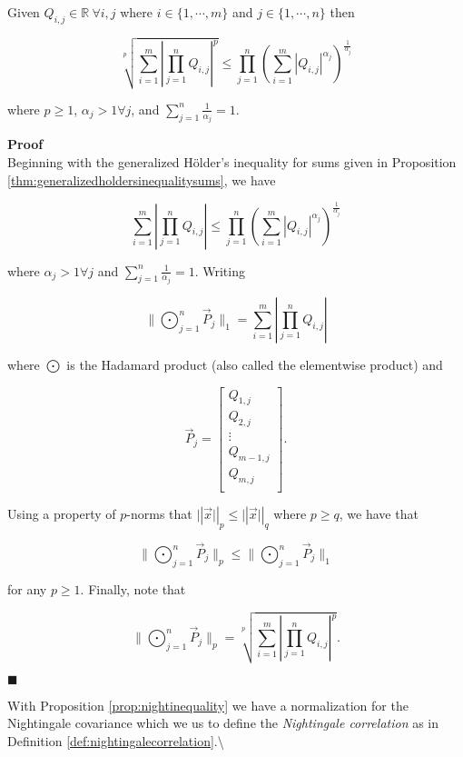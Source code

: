 \documentclass[
  letterpaper,
  DIV=11,
  numbers=noendperiod]{scrreprt}
\begin{document}
\begin{Proposition}[myproposition=, label=prop:nightinequality]
Given $Q_{i,j} \in \mathbb{R}\ \forall i,j$ where $i \in \{ 1, \cdots, m \}$ and $j \in \{ 1, \cdots, n \}$ then

$$\sqrt[p]{\sum_{i=1}^{m} \left|\prod_{j=1}^{n} Q_{i,j}\right|^p} \leq \prod_{j=1}^{n} \left( \sum_{i=1}^{m} |Q_{i,j}|^{\alpha_j} \right)^{\frac{1}{\alpha_j}}$$

where $p \geq 1$, $\alpha_j > 1 \forall j$, and $\sum_{j=1}^n \frac{1}{\alpha_j} = 1$.

\tcbline
\textbf{Proof}\\
\scriptsize
Beginning with the generalized H\"older's inequality for sums given in Proposition \ref{thm:generalizedholdersinequalitysums}, we have

$$\sum_{i=1}^{m} \left|\prod_{j=1}^{n} Q_{i,j}\right| \leq \prod_{j=1}^{n} \left( \sum_{i=1}^{m} |Q_{i,j}|^{\alpha_j} \right)^{\frac{1}{\alpha_j}}$$

where $\alpha_j > 1 \forall j$ and $\sum_{j=1}^n \frac{1}{\alpha_j} = 1$. Writing 

$$\biggl \| \bigodot_{j=1}^{n} \vec{P}_j \biggr  \|_1 = \sum_{i=1}^{m} \left|\prod_{j=1}^{n} Q_{i,j}\right|$$

where $\bigodot$ is the Hadamard product (also called the elementwise product) and 

$$\vec{P}_j = \begin{bmatrix}
Q_{1,j} \\
Q_{2,j} \\
\vdots \\
Q_{m-1,j} \\
Q_{m,j} \\
\end{bmatrix}.$$

Using a property of $p$-norms that $\vert| \vec{x} \vert|_p \leq \vert| \vec{x} \vert|_q$ where $p \geq q$, we have that 

$$\biggl \| \bigodot_{j=1}^{n} \vec{P}_j \biggr  \|_p \leq \biggl \| \bigodot_{j=1}^{n} \vec{P}_j \biggr  \|_1$$

for any $p \geq 1$. Finally, note that

$$\biggl \| \bigodot_{j=1}^{n} \vec{P}_j \biggr  \|_p = \sqrt[p]{\sum_{i=1}^{m} \left|\prod_{j=1}^{n} Q_{i,j}\right|^p}.$$

\hfill $\blacksquare$
\end{Proposition}

With Proposition \ref{prop:nightinequality} we have a normalization for
the Nightingale covariance which we us to define the
\textit{Nightingale correlation} as in Definition
\ref{def:nightingalecorrelation}.\textbackslash{}
\end{document}
